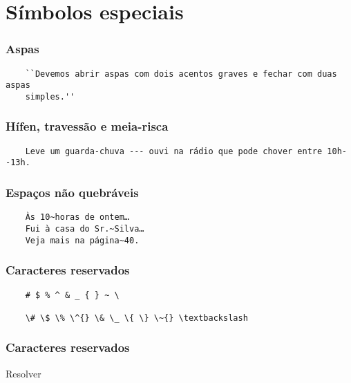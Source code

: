 \section{Símbolos especiais}

\begin{frame}[fragile]
  \frametitle{Aspas}
  \begin{verbatim}
    ``Devemos abrir aspas com dois acentos graves e fechar com duas aspas
    simples.''
  \end{verbatim}
\end{frame}

\begin{frame}[fragile]
  \frametitle{Hífen, travessão e meia-risca}
  \begin{verbatim}
    Leve um guarda-chuva --- ouvi na rádio que pode chover entre 10h--13h.
  \end{verbatim}
\end{frame}

\begin{frame}[fragile]
  \frametitle{Espaços não quebráveis}
  \begin{verbatim}
    Às 10~horas de ontem…
    Fui à casa do Sr.~Silva…
    Veja mais na página~40.
  \end{verbatim}
\end{frame}

\begin{frame}[fragile]
  \frametitle{Caracteres reservados}
  \begin{verbatim}
    # $ % ^ & _ { } ~ \

    \# \$ \% \^{} \& \_ \{ \} \~{} \textbackslash
  \end{verbatim}
\end{frame}

\begin{frame}
  \frametitle{Caracteres reservados}
  \huge
  Resolver 
\end{frame}
